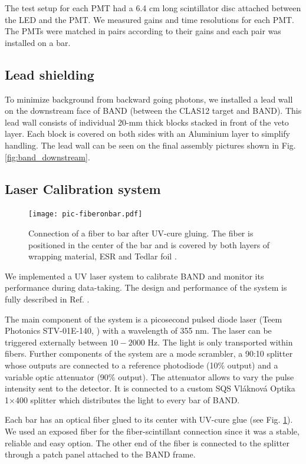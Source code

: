 \documentclass[3p,final,twocolumn]{elsarticle}
\begin{document}
The test setup for each PMT had a 6.4 \si{\centi\meter} long scintillator disc attached between the LED and the PMT. We measured gains and time resolutions for each PMT. The PMTs were matched in pairs according to their gains and each pair was installed on a bar.


\subsection{Lead shielding}
To minimize background from backward going photons, we installed a
lead wall on the downstream face of BAND (between the CLAS12 target
and BAND). This lead wall consists of individual 20-\si{\milli\meter}
thick blocks stacked in front of the veto layer. Each block is covered
on both sides with an Aluminium layer to simplify handling. The
lead wall can be seen on the final assembly pictures shown in
Fig. \ref{fig:band_downstream}.


\subsection{Laser Calibration system}
\label{sec:laserystem}
\begin{figure}[tb]
	\centering
		\texttt{[image: pic-fiberonbar.pdf]}
	\caption{Connection of a fiber to bar after UV-cure gluing. The fiber is positioned in the center of the bar and is covered by both layers of wrapping material, ESR \cite{3MESR} and Tedlar foil \cite{tedlarfoil}.}
	\label{fig:pic-fiberonbar}
\end{figure}
We implemented a UV laser system to calibrate BAND and monitor its
performance during data-taking. The design and performance of the
system is fully described in Ref. \cite{band-laser}. 

The main component of the system is a picosecond pulsed diode laser (Teem Photonics STV-01E-140, \cite{teem_laser}) with a wavelength of 355 \si{\nano\meter}. The laser can be triggered externally between $10-2000$ \si{\hertz}. The light is only transported within fibers. Further components of the system are a mode scrambler, a 90:10 splitter whose outputs are connected to a reference photodiode (10\% output) and a variable optic attenuator \cite{attenuator} (90\% output). The attenuator allows to vary the pulse intensity sent to the detector. It is connected to a custom SQS Vl\'aknov\'a Optika 1$\times$400 splitter which distributes the light to every bar of BAND. 

Each bar has an optical fiber glued to its center with UV-cure glue (see
Fig. \ref{fig:pic-fiberonbar}). We used an exposed fiber for the fiber-scintillant connection since it was a stable, reliable and easy option. The other end of the fiber is connected to the splitter through a patch panel attached to the BAND frame. 
\end{document}
